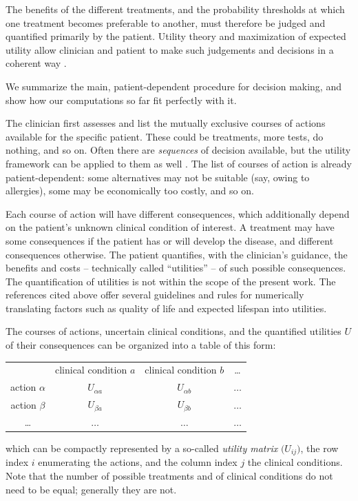 \documentclass[utf8]{FrontiersinHarvard} %
\renewcommand*{\|}[1][]{\nonscript\:#1\vert\nonscript\:\mathopen{}}
\begin{document}
The benefits of the different treatments, and the probability thresholds at which one treatment becomes preferable to another, must therefore be judged and quantified primarily by the patient. Utility theory and maximization of expected utility allow clinician and patient to make such judgements and decisions in a coherent way \citetext{\citealt{soxetal1988_r2013,huninketal2001_r2014}; see also the clear and charming exposition by \citealt{lindley1971_r1988}, and \citealt{ohaganetal2006}}.

We summarize the main, patient-dependent procedure for decision making, and show how our computations so far fit perfectly with it.

The clinician first assesses and list the mutually exclusive courses of actions available for the specific patient. These could be treatments, more tests, do nothing, and so on. Often there are \emph{sequences} of decision available, but the utility framework can be applied to them as well \citep[see references above and][]{raiffa1968_r1970}. The list of courses of action is already patient-dependent: some alternatives may not be suitable (say, owing to allergies), some may be economically too costly, and so on.

Each course of action will have different consequences, which additionally depend on the patient's unknown clinical condition of interest. A treatment may have some consequences if the patient has or will develop the disease, and different consequences otherwise. The patient quantifies, with the clinician's guidance, the benefits and costs -- technically called \enquote{utilities} -- of such possible consequences. The quantification of utilities is not within the scope of the present work. The references cited above offer several guidelines and rules for numerically translating factors such as quality of life and expected lifespan into utilities.

The courses of actions, uncertain clinical conditions, and the quantified utilities $U$ of their consequences can be organized into a table of this form:
  \begin{center}
    \begin{tabular}{cccc}
      &{\small clinical condition $a$}&{\small clinical condition $b$}&{\small \ldots}
      \\[2\jot]
      {\small action $\alpha$} & $U_{\alpha a}$ & $U_{\alpha b}$ &$\dotso$ \\[\jot]
      {\small action $\beta$} & $U_{\beta a}$ & $U_{\beta b}$ &$\dotso$ \\[\jot]
      {\small \ldots} &$\dotso$&$\dotso$&$\dotso$
    \end{tabular}
  \end{center}
which can be compactly represented by a so-called \emph{utility matrix} $\bigl(U_{ij})$, the row index $i$ enumerating the actions, and the column index $j$ the clinical conditions. Note that the number of possible treatments and of clinical conditions do not need to be equal; generally they are not.
\end{document}
